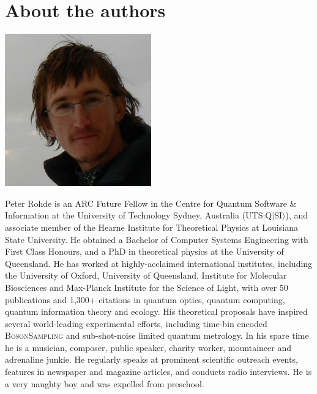 %
%

\section*{About the authors}

%
%

\begin{center}
\includegraphics[width=0.475\textwidth]{photo_peter_rohde}
\end{center}

Peter Rohde is an ARC Future Fellow in the Centre for Quantum Software \& Information at the University of Technology Sydney, Australia (UTS:Q$|$SI$\rangle$), and associate member of the Hearne Institute for Theoretical Physics at Louisiana State University. He obtained a Bachelor of Computer Systems Engineering with First Class Honours, and a PhD in theoretical physics at the University of Queensland. He has worked at highly-acclaimed international institutes, including the University of Oxford, University of Queensland, Institute for Molecular Biosciences and Max-Planck Institute for the Science of Light, with over 50 publications and 1,300+ citations in quantum optics, quantum computing, quantum information theory and ecology. His theoretical proposals have inspired several world-leading experimental efforts, including time-bin encoded \textsc{BosonSampling} and sub-shot-noise limited quantum metrology. In his spare time he is a musician, composer, public speaker, charity worker, mountaineer and adrenaline junkie. He regularly speaks at prominent scientific outreach events, features in newspaper and magazine articles, and conducts radio interviews. He is a very naughty boy and was expelled from preschool.

%
%

